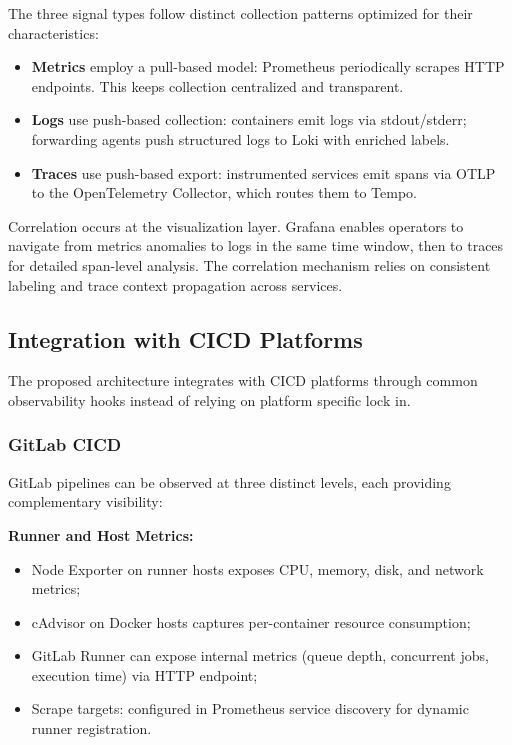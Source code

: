 The three signal types follow distinct collection patterns optimized for their characteristics:

\begin{itemize}
    \item \textbf{Metrics} employ a pull-based model: Prometheus periodically scrapes HTTP endpoints. This keeps collection centralized and transparent.
    \item \textbf{Logs} use push-based collection: containers emit logs via stdout/stderr; forwarding agents push structured logs to Loki with enriched labels.
    \item \textbf{Traces} use push-based export: instrumented services emit spans via OTLP to the OpenTelemetry Collector, which routes them to Tempo.
\end{itemize}

Correlation occurs at the visualization layer. Grafana enables operators to navigate from metrics anomalies to logs in the same time window, then to traces for detailed span-level analysis. The correlation mechanism relies on consistent labeling and trace context propagation across services.

\subsection{Integration with \texorpdfstring{\gls{CICD}}{CI/CD} Platforms}
\label{subsec:cicd_integration}

The proposed architecture integrates with \gls{CICD} platforms through common observability hooks instead of relying on platform specific lock in.

\subsubsection{GitLab \texorpdfstring{\gls{CICD}}{CI/CD}}
\label{subsubsec:gitlab_integration}

GitLab pipelines can be observed at three distinct levels, each providing complementary visibility:

\textbf{Runner and Host Metrics:}
\begin{itemize}
    \item Node Exporter on runner hosts exposes CPU, memory, disk, and network metrics;
    \item cAdvisor on Docker hosts captures per-container resource consumption;
    \item GitLab Runner can expose internal metrics (queue depth, concurrent jobs, execution time) via HTTP endpoint;
    \item Scrape targets: configured in Prometheus service discovery for dynamic runner registration.
\end{itemize}

